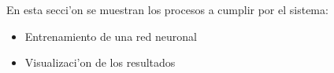 En esta secci'on se muestran los procesos a cumplir por el sistema:
\begin{itemize}
\item Entrenamiento de una red neuronal
\item Visualizaci'on de los resultados
\end{itemize}

\clearpage